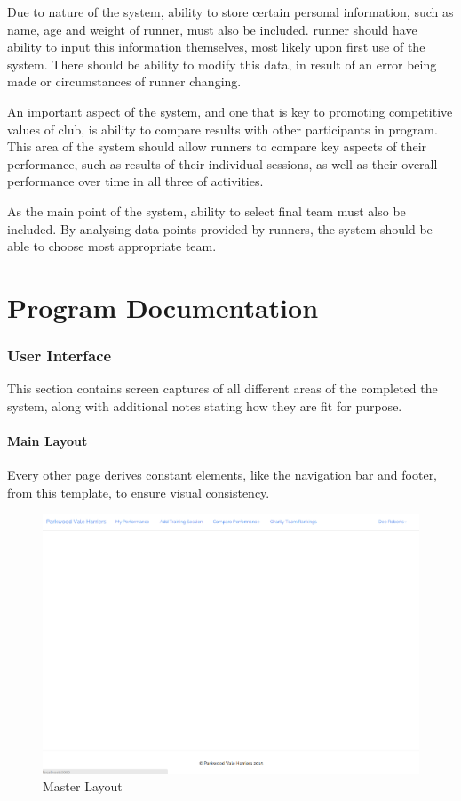 \documentclass{article}[12pt,a4paper]
\begin{document}
Due to nature of the system, ability to store certain personal information, such as name, age and weight of runner, must also be included. runner should have ability to input this information themselves, most likely upon first use of the system. There should be ability to modify this data, in result of an error being made or circumstances of runner changing.

An important aspect of the system, and one that is key to promoting competitive values of club, is ability to compare results with other participants in program. This area of the system should allow runners to compare key aspects of their performance, such as results of their individual sessions, as well as their overall performance over time in all three of activities.

As the main point of the system, ability to select final team must also be included. By analysing data points provided by runners, the system should be able to choose most appropriate team.

\cleardoublepage


\part{Program Documentation}

\section{User Interface}
This section contains screen captures of all different areas of the completed the system, along with additional notes stating how they are fit for purpose.

\subsection{Main Layout}
Every other page derives constant elements, like the navigation bar and footer, from this template, to ensure visual consistency.

\begin{figure}[h!]
  \includegraphics[scale=0.30]{final_ui/layout}
  \caption{Master Layout}
\end{figure}
\end{document}
